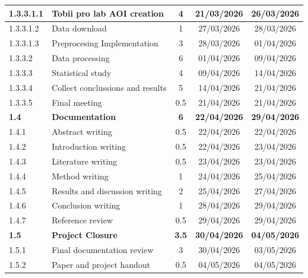 \begin{landscape}
\begin{longtable}{|l|l|c|c|c|}
        \hline
        1.3.3.1.1 & Tobii pro lab AOI creation & 4 & 21/03/2026 & 26/03/2026 \\
        \hline
        1.3.3.1.2 & Data download & 1 & 27/03/2026 & 28/03/2026 \\
        \hline
        1.3.3.1.3 & Preprocesing Implementation & 3 & 28/03/2026 & 01/04/2026 \\
        \hline
        1.3.3.2 & Data processing & 6 & 01/04/2026 & 09/04/2026 \\
        \hline
        1.3.3.3 & Statistical study & 4 & 09/04/2026 & 14/04/2026 \\
        \hline
        1.3.3.4 & Collect conclussions and results & 5 & 14/04/2026 & 21/04/2026 \\
        \hline
        1.3.3.5 & Final meeting & 0.5 & 21/04/2026 & 21/04/2026 \\
        \hline
        \textbf{1.4} & \textbf{Documentation} & \textbf{6} & \textbf{22/04/2026} & \textbf{29/04/2026} \\
        \hline
        1.4.1 & Abstract writing & 0.5 & 22/04/2026 & 22/04/2026 \\
        \hline
        1.4.2 & Introduction writing & 0.5 & 22/04/2026 & 23/04/2026 \\
        \hline
        1.4.3 & Literature writing & 0.5 & 23/04/2026 & 23/04/2026 \\
        \hline
        1.4.4 & Method writing & 1 & 24/04/2026 & 25/04/2026 \\
        \hline
        1.4.5 & Results and discussion writing & 2 & 25/04/2026 & 27/04/2026 \\
        \hline
        1.4.6 & Conclusion writing & 1 & 28/04/2026 & 29/04/2026 \\
        \hline
        1.4.7 & Reference review & 0.5 & 29/04/2026 & 29/04/2026 \\
        \hline
        \textbf{1.5} & \textbf{Project Closure} & \textbf{3.5} & \textbf{30/04/2026} & \textbf{04/05/2026} \\
        \hline
        1.5.1 & Final documentation review & 3 & 30/04/2026 & 03/05/2026 \\
        \hline
        1.5.2 & Paper and project handout & 0.5 & 04/05/2026 & 04/05/2026 \\
        \hline
\end{longtable}
\end{landscape}
